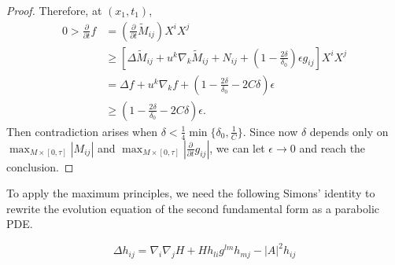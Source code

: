 \begin{proof}
	Therefore, at $(x_1,t_1)$,
	\begin{equation*}
	\begin{split}
		0>\frac{\partial }{\partial t} f
		&=(\frac{\partial }{\partial t} \tilde{M}_{ij }^{}) X^i X^j\\
		&\geq \left[ \Delta \tilde{M}_{ij }^{}+ u^k \nabla_{k}^{} \tilde{M}_{ij }^{} + N_{ij }^{} + (1-\frac{2 \delta }{\delta_0})\epsilon g_{ij }^{} \right] X^i X^j\\
		&= \Delta f + u^k \nabla_{k}^{} f + (1-\frac{2 \delta }{\delta_0}-2C \delta ) \epsilon\\
		&\geq (1-\frac{2 \delta }{\delta_0}-2C \delta ) \epsilon.
	\end{split}
	\end{equation*}
	Then contradiction arises when $\delta <\frac{1}{4} \min\{\delta _0, \frac{1}{C}\}.$ Since now $\delta $ depends only on $\max_{M \times [0,\tau ]} \left| M_{ij }^{}  \right|$ and $\max_{M \times [0,\tau ]} \left| \frac{\partial }{\partial t} g_{ij }^{}  \right|$, we can let $\epsilon \to 0$ and reach the conclusion. 

\end{proof}

To apply the maximum principles, we need the following Simons' identity to rewrite the evolution equation of the second fundamental form as a parabolic PDE.

\begin{lemma}
	 \label{simon}
	\[\Delta h_{ij}^{} = \nabla_{i}\nabla_{j} H + H h_{li}^{} g_{}^{lm } h_{mj}^{} - \left| A \right| ^2 h_{ij}^{} \]
\end{lemma}

